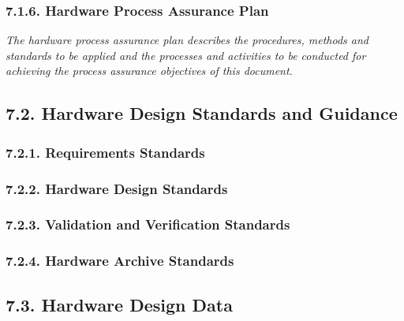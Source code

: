 \documentclass[
]{article}
\begin{document}
\hypertarget{hardware-process-assurance-plan}{%
\subsubsection{7.1.6. Hardware Process Assurance
Plan}\label{hardware-process-assurance-plan}}

\emph{The hardware process assurance plan describes the procedures,
methods and standards to be applied and the processes and activities to
be conducted for achieving the process assurance objectives of this
document.}

\hypertarget{hardware-design-standards-and-guidance}{%
\subsection{7.2. Hardware Design Standards and
Guidance}\label{hardware-design-standards-and-guidance}}

\hypertarget{requirements-standards}{%
\subsubsection{7.2.1. Requirements
Standards}\label{requirements-standards}}

\hypertarget{hardware-design-standards}{%
\subsubsection{7.2.2. Hardware Design
Standards}\label{hardware-design-standards}}

\hypertarget{validation-and-verification-standards}{%
\subsubsection{7.2.3. Validation and Verification
Standards}\label{validation-and-verification-standards}}

\hypertarget{hardware-archive-standards}{%
\subsubsection{7.2.4. Hardware Archive
Standards}\label{hardware-archive-standards}}

\hypertarget{hardware-design-data}{%
\subsection{7.3. Hardware Design Data}\label{hardware-design-data}}
\end{document}
